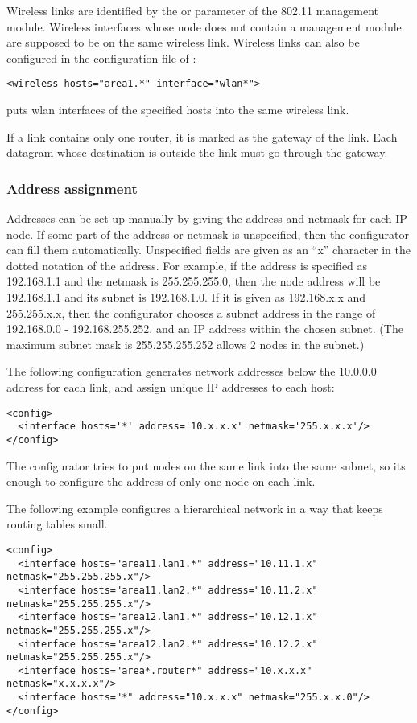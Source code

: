 Wireless links are identified by the  or 
parameter of the 802.11 management module. Wireless interfaces
whose node does not contain a management module are supposed
to be on the same wireless link. Wireless links can also be
configured in the configuration file of :
\begin{verbatim}
<wireless hosts="area1.*" interface="wlan*">
\end{verbatim}
puts wlan interfaces of the specified hosts into the same wireless link.

If a link contains only one router, it is marked as the gateway
of the link. Each datagram whose destination is outside the link
must go through the gateway.

\subsubsection*{Address assignment}

Addresses can be set up manually by giving the address and netmask for
each IP node. If some part of the address or netmask is unspecified,
then the configurator can fill them automatically. Unspecified fields
are given as an ``x'' character in the dotted notation of the address.
For example, if the address is specified as 192.168.1.1 and the
netmask is 255.255.255.0, then the node address will be 192.168.1.1
and its subnet is 192.168.1.0. If it is given as 192.168.x.x and
255.255.x.x, then the configurator chooses a subnet address in the range
of 192.168.0.0 - 192.168.255.252, and an IP address within the chosen 
subnet. (The maximum subnet mask is 255.255.255.252 allows 2 nodes in the subnet.)

The following configuration generates network addresses below the 10.0.0.0
address for each link, and assign unique IP addresses to each host:

\begin{verbatim}
<config>
  <interface hosts='*' address='10.x.x.x' netmask='255.x.x.x'/>
</config>
\end{verbatim}

The configurator tries to put nodes on the same link into the same subnet,
so its enough to configure the address of only one node on each link.

The following example configures a hierarchical network in a way that keeps
routing tables small.
\begin{verbatim}
<config>
  <interface hosts="area11.lan1.*" address="10.11.1.x" netmask="255.255.255.x"/>
  <interface hosts="area11.lan2.*" address="10.11.2.x" netmask="255.255.255.x"/>
  <interface hosts="area12.lan1.*" address="10.12.1.x" netmask="255.255.255.x"/>
  <interface hosts="area12.lan2.*" address="10.12.2.x" netmask="255.255.255.x"/>
  <interface hosts="area*.router*" address="10.x.x.x" netmask="x.x.x.x"/>
  <interface hosts="*" address="10.x.x.x" netmask="255.x.x.0"/>
</config>
\end{verbatim}

